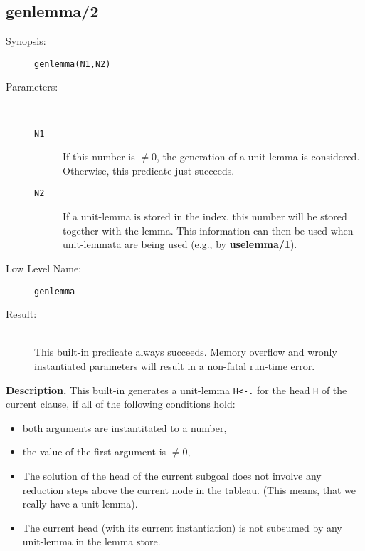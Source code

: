 %
%
%
\subsection{genlemma/2}

\begin{description}
\item[Synopsis:]
	{\tt genlemma(N1,N2)}
\item[Parameters:]\ \\[-0.5cm]
	\begin{description}
	\item[{\tt N1}]
	If this number is $\neq 0$, the generation of a unit-lemma
	is considered. Otherwise, this predicate just succeeds.
	\item[{\tt N2}]
	If a unit-lemma is stored in the index, this number will be
	stored together with the lemma. This information can then
	be used when unit-lemmata are being used (e.g., by {\bf uselemma/1}).
	\end{description}
\item[Low Level Name:]
	{\tt genlemma}
\item[Result:]\ \\
	This built-in predicate always succeeds. Memory overflow and
	wronly instantiated parameters will result in a 
	non-fatal run-time error.
\end{description}

\vspace*{0.5cm}
\noindent
{\bf Description.}
This built-in generates a unit-lemma {\tt H<-.} for the
head {\tt H} of the current clause, if all of the following
conditions hold:
\begin{itemize}
\item
both arguments are instantitated to a number,
\item
the value of the first argument is $\neq 0$,
\item
The solution of the head of the current subgoal does not involve
any reduction steps above the current node in the tableau.
(This means, that we really have a unit-lemma).
\item
The current head (with its current instantiation) is not subsumed
by any unit-lemma in the lemma store.
\end{itemize}

